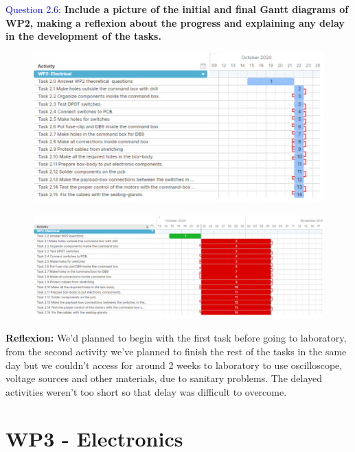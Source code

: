 \documentclass[12pt, a4papre]{article}
\begin{document}
	\textcolor{blue}{Question 2.6:} \textbf{Include a picture of the initial and final Gantt diagrams of WP2, making a reflexion about the progress and explaining any delay in the development of the tasks.}
	
	\begin{figure}[H]
		\begin{center}
		\includegraphics[width=135mm]{WP2_ini}
		\end{center}
	\end{figure}
	\begin{figure}[H]
		\begin{center}
		\includegraphics[width=135mm]{WP2_fin}
		\end{center}
	\end{figure}
	
	\textbf{Reflexion: }We’d planned to begin with the first task before going to laboratory, from the second activity we’ve planned to finish the rest of the tasks in the same day but we couldn’t access for around 2 weeks to laboratory to use oscilloscope, voltage sources and other materials, due to sanitary problems. The delayed activities weren’t too short so that delay was difficult to overcome.
	
	\newpage
	\section{WP3 - Electronics}
\end{document}
